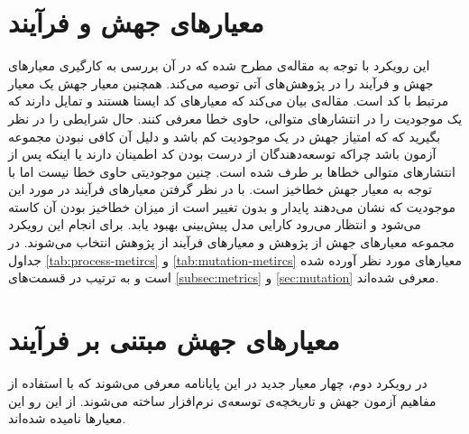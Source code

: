 \section{معیارهای جهش و فرآیند}
\label{sec:method-phase1}

این رویکرد با توجه به مقاله‌ی \cite{bowes2016mutation} مطرح شده که در آن بررسی به کارگیری معیارهای جهش و فرآیند را در پژوهش‌های آتی توصیه می‌کند.  همچنین  معیار جهش یک معیار  مرتبط با کد است. مقاله‌ی \cite{rahman2013and}  بیان می‌کند که معیارهای کد ایستا هستند و تمایل دارند که یک موجودیت را در انتشارهای متوالی، حاوی خطا معرفی کنند. حال شرایطی را در نظر بگیرید که که امتیاز جهش در یک موجودیت کم باشد و دلیل آن کافی نبودن مجموعه آزمون باشد چراکه توسعه‌دهندگان از درست بودن کد اطمینان دارند یا اینکه پس از انتشارهای متوالی خطاها بر طرف شده است. چنین موجودیتی حاوی خطا نیست اما با توجه به معیار جهش خطا‌خیز است. با در نظر گرفتن معیارهای فرآیند در مورد این موجودیت که نشان می‌دهند پایدار و بدون تغییر است از میزان خطا‌خیز بودن آن کاسته می‌شود و انتظار می‌رود کارایی مدل پیش‌بینی بهبود یابد. 
برای  انجام این رویکرد مجموعه معیارهای جهش  از پژوهش \cite{bowes2016mutation}  و معیارهای فرآیند از پژوهش \cite{rahman2013and} انتخاب می‌شوند. در جداول  \ref{tab:process-metircs} و \ref{tab:mutation-metircs} معیارهای مورد نظر آورده شده است و به ترتیب در قسمت‌های \ref{subsec:metrics} و \ref{sec:mutation} معرفی شده‌اند.\\




\section{معیارهای جهش مبتنی بر فرآیند}
\label{sec:method-phase-two}
در رویکرد دوم، چهار معیار جدید در این پایانامه معرفی می‌شوند که با استفاده از مفاهیم آزمون جهش و تاریخچه‌ی توسعه‌ی نرم‌افزار ساخته می‌شوند. از این رو این معیارها   نامیده شده‌اند.

